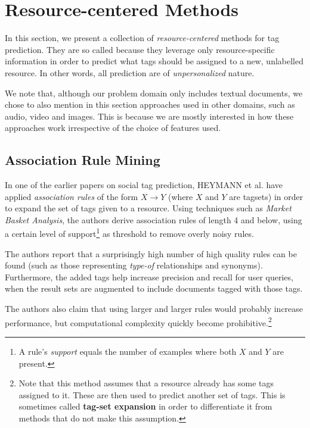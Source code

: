 \section{Resource-centered Methods}\label{section:resource_centered_methods}

In this section, we present a collection of  \textit{resource-centered} methods for tag prediction. They are so called because they leverage only resource-specific information in order to predict what tags should be assigned to a new, unlabelled resource. In other words, all prediction are of \textit{unpersonalized} nature.

We note that, although our problem domain only includes textual documents, we chose to also mention in this section approaches used in other domains, such as audio, video and images. This is because we are mostly interested in how these approaches work irrespective of the choice of features used.

\subsection{Association Rule Mining}


In one of the earlier papers on social tag prediction, HEYMANN et al. \citeyearpar{heymann_etal_2008} have applied \textit{association rules} of the form $X \rightarrow Y$ (where $X$ and $Y$ are tagsets) in order to expand the set of tags given to a resource. Using techniques such as \textit{Market Basket Analysis}, the authors derive association rules of length 4 and below, using a certain level of support\footnote{A rule's \textit{support} equals the number of examples where both $X$ and $Y$ are present.} as threshold to remove overly noisy rules.

The authors report \citep{heymann_etal_2008} that a surprisingly high number of high quality rules can be found (such as those representing \textit{type-of} relationships and synonyms). Furthermore, the added tags help increase precision and recall for user queries, when the result sets are augmented to include documents tagged with those tags.

The authors also claim that using larger and larger rules would probably increase performance, but computational complexity quickly become prohibitive.\footnote{Note that this method assumes that a resource already has some tags assigned to it. These are then used to predict another set of tags. This is sometimes called \textbf{tag-set expansion} in order to differentiate it from methods that do not make this assumption.}

